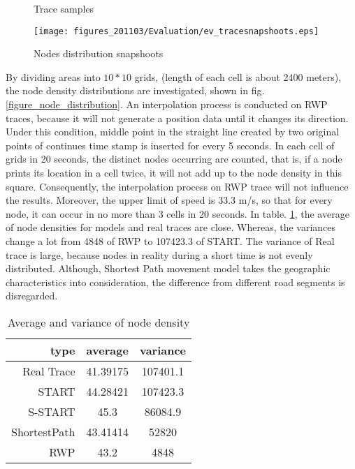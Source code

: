 \begin{figure*}[htbp]
\centering
{}
\caption{Trace samples}\label{figure_tracesample}
\end{figure*}


\begin{figure*}[htbp]
\centering
\texttt{[image: figures\_201103/Evaluation/ev\_tracesnapshoots.eps]}\\
\caption{Nodes distribution snapshoots}\label{figure_tracesnapshoots}
\end{figure*}

By dividing areas into $10*10$ grids, (length of each cell is about 2400 meters), the node density distributions are investigated, shown in fig.\ref{figure_node_distribution}. An interpolation process is conducted on RWP traces, because it will not generate a position data until it changes its direction. Under this condition, middle point in the straight line created by two original points of continues time stamp is inserted for every 5 seconds. In each cell of grids in 20 seconds, the distinct nodes occurring are counted, that is, if a node prints its location in a cell twice, it will not add up to the node density in this square. Consequently, the interpolation process on RWP trace will not influence the results. Moreover, the upper limit of speed is 33.3 m/s, so that for every node, it can occur in no more than 3 cells in 20 seconds.  In table. \ref{figure_avg_var_node_density}, the average of node densities for models and real traces are close. Whereas, the variances change a lot from 4848 of RWP to 107423.3 of START. The variance of Real trace is large, because nodes in reality during a short time is not evenly distributed. Although, Shortest Path movement model takes the geographic characteristics into consideration, the difference from different road segments is disregarded.

\begin{table}
\centering
\caption{Average and variance of node density}\label{figure_avg_var_node_density}
\begin{tabular}{r|c|c}
  \hline
 type & average & variance\\
  \hline
  Real Trace & 41.39175 & 107401.1 \\
  START & 44.28421 & 107423.3 \\
  S-START & 45.3 & 86084.9\\
  ShortestPath & 43.41414 & 52820\\
  RWP & 43.2 & 4848 \\
  \hline
\end{tabular}
\end{table}

